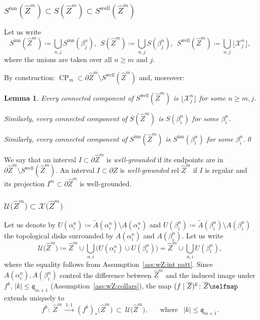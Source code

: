 \documentclass{amsart}
\renewcommand{\sp}{{\ \ }}
\newcommand{\1}{{\mathbb 1 }}
\newcommand\XX{\mathcal{X}}
\newcommand{\wZ}{{\widehat Z}}
\newcommand{\qq}{\mathfrak{q}}
\newcommand\inn{{\operatorname{inn}}}
\newcommand\UU{\mathcal{U}}
\newcommand{\well}{{\operatorname{well}}}
\newtheorem{lem}[thm]{Lemma}
\theoremstyle{remark}
\numberwithin{equation}{section}
\theoremstyle{definition}
\newcommand{\CP}{{\operatorname{CP}}}
\begin{document}
 
 

\subsubsection{$S^\inn (\wZ^m) \subset S (\wZ^m)\subset S^\well (\wZ^m)$} 
\label{sss:S^well}
 Let us write
\[ S^\inn(\wZ^m)\coloneqq \bigcup_{n,j} S^\inn (\beta^n_j), \sp S(\wZ^m)\coloneqq \bigcup_{n,j} S (\beta^n_j), \sp S^\well(\wZ^m)\coloneqq \bigcup_{n,j} \lfloor \XX^n_j\rfloor ,\]
where the unions are taken over all $n\ge m$ and $j$. 

By construction: $\CP_m \subset\partial \wZ^m\setminus  S^\well (\wZ^m)$ and, moreover:

\begin{lem}
\label{lem:S are disj}
Every connected component of $S^\well (\wZ^m)$ is $\lfloor \XX^n_j\rfloor $ for some $n\ge m, j$.

Similarly, every connected component of $S (\wZ^m)$ is $S(\beta^n_i) $ for some $\beta^n_i$.

Similarly, every connected component of $S^\inn (\wZ^m)$ is $S^\inn(\beta^n_i) $ for some $\beta^n_i$.\qed
\end{lem}


We say that an interval $I\subset \partial \wZ^m$ is \emph{well-grounded} if its endpoints are in ${\partial \wZ^m\setminus S^\well (\wZ^m)}$. An interval $I\subset \partial Z$ is \emph{well-grounded} rel $\wZ^m$ if $I$ is regular and its projection $I^m\subset \partial \wZ^m$ is well-grounded.
 
 
\subsubsection{$\UU\big(\wZ^m\big)\subset \XX\big(\wZ^m\big)$} \label{sss:UU and ZZ}Let us denote by $U(\alpha^n_i)\coloneqq \widetilde A(\alpha^n_i)\setminus A(\alpha^n_i)$ and $U(\beta^n_i)\coloneqq \widetilde A(\beta^n_i)\setminus A(\beta^n_i)$ the topological disks surrounded by $A(\alpha^n_i)$ and $A(\beta^n_i)$. Let us write
\[\UU\big(\wZ^m\big)\coloneqq \wZ^m\cup \bigcup_{n,i} \big( U(\alpha^n_i)\cup U(\beta^n_i)\big) =\wZ^m\cup \bigcup_{n,i}  U(\beta^n_i),\]
where the equality follows from Assumption~\ref{ass:wZ:int patt}. Since $A(\alpha^n_i),A(\beta^n_i)$ control the difference between $\wZ^m$ and the induced image under $f^k$, $|k|\le \qq_{m+1}$ (Assumption~\ref{ass:wZ:collars}), the map $(f\mid \overline Z)^k\colon \overline Z\selfmap$ extends uniquely to 
\begin{equation}
\label{eq:dfn UU(wZ)}
f^k\colon \ \wZ^m\ \overset{1:1}{\longrightarrow}\ (f^k)_* \big(\wZ^m\big) \ \subset \ \UU\big(\wZ^m\big),\sp\sp\sp\text{ where }\sp |k|\le \qq_{m+1}.
\end{equation}
\end{document}
